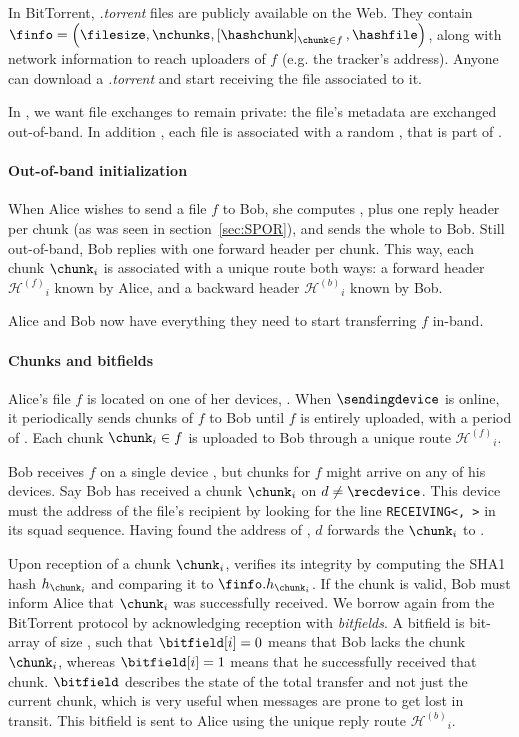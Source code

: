 In BitTorrent, \textit{.torrent} files are publicly available on the Web.
They contain $\finfo = \left(\filesize, \nchunks, \left[\hashchunk\right]_{\chunk \in f}, \hashfile\right)$, 
along with network information to reach uploaders of $f$ (e.g. the tracker's address).
Anyone can download a \textit{.torrent} and start receiving the file associated to it.

In \name, we want file exchanges to remain private: the file's metadata are exchanged out-of-band.
In addition , each file is associated with a random \fileid, that is part of \finfo.

\newcommand\forwardheader{\ensuremath{\mathcal{H}^{(f)}}}
\newcommand\backwardheader{\ensuremath{\mathcal{H}^{(b)}}}

\paragraph*{Out-of-band initialization} 
When Alice wishes to send a file $f$ to Bob, she computes \finfo, 
plus one reply header per chunk (as was seen in section~\ref{sec:SPOR}), and sends the whole to Bob.
Still out-of-band, Bob replies with one forward header per chunk.
This way, each chunk $\chunk_i$ is associated with a unique route both ways: 
a forward header $\forwardheader_i$ known by Alice, and a backward header $\backwardheader_i$ known by Bob.

Alice and Bob now have everything they need to start transferring $f$ in-band.


\paragraph*{Chunks and bitfields}
Alice's file $f$ is located on one of her devices, \sendingdevice. 
When $\sendingdevice$ is online, it periodically sends chunks of $f$ to Bob until $f$ is entirely uploaded, with a period of \tupload.
Each chunk $\chunk_i \in f$ is uploaded to Bob through a unique route $\forwardheader_i$.

Bob receives $f$ on a single device \recdevice, but chunks for $f$ might arrive on any of his devices.
Say Bob has received a chunk $\chunk_i$ on $d \neq \recdevice$.
This device must the address of the file's recipient \recdevice by looking for the line \texttt{RECEIVING<\recdevice, \fileid>} in its squad sequence.
Having found the address of \recdevice, $d$ forwards the $\chunk_i$ to \recdevice.

Upon reception of a chunk $\chunk_i$, \recdevice verifies its integrity by computing the SHA1 hash $h_{\chunk_i}$ and comparing it to $\finfo.h_{\chunk_i}$.
If the chunk is valid, Bob must inform Alice that $\chunk_i$ was successfully received.
We borrow again from the BitTorrent protocol by acknowledging reception with \emph{bitfields}.
A bitfield \bitfield is bit-array of size \nchunks, such that $\bitfield[i] = 0$ means that Bob lacks the chunk $\chunk_i$, whereas $\bitfield[i] = 1$ means that he successfully received that chunk.
$\bitfield$ describes the state of the total transfer and not just the current chunk, which is very useful when messages are prone to get lost in transit. 
This bitfield is sent to Alice using the unique reply route $\backwardheader_i$.


